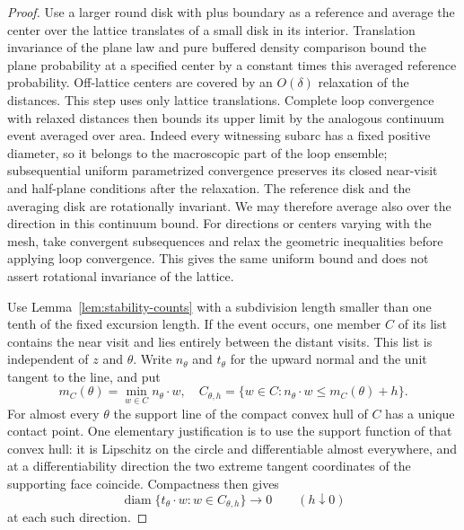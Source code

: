 \begin{proof}
Use a larger round disk with plus boundary as a reference and average
the center over the lattice translates of a small disk in its interior.
Translation invariance of the plane law and pure buffered density
comparison bound the plane probability at a specified center by
a constant times this averaged reference probability.  Off-lattice
centers are covered by an $O(\delta)$ relaxation of the distances.
This step uses only lattice translations.  Complete loop convergence
with relaxed distances then bounds its upper limit by the analogous
continuum event averaged over area.  Indeed every witnessing subarc
has a fixed positive diameter, so it belongs to the macroscopic part
of the loop ensemble; subsequential uniform parametrized convergence
preserves its closed near-visit and half-plane conditions after the
relaxation.  The reference disk and the
averaging disk are rotationally invariant.  We may therefore average
also over the direction in this continuum bound.  For directions or
centers varying with the mesh, take convergent subsequences and relax
the geometric inequalities before applying loop convergence.  This
gives the same uniform bound and does not assert rotational
invariance of the lattice.

Use Lemma~\ref{lem:stability-counts} with a subdivision length smaller
than one tenth of the fixed excursion length.  If the event occurs,
one member $C$ of its list contains the near visit and lies entirely
between the distant visits.  This list is independent of $z$ and
$\theta$.  Write $n_\theta$ and $t_\theta$ for the upward normal and
the unit tangent to the line, and put
\[
 m_C(\theta)=\min_{w\in C}n_\theta\cdot w,
 \quad
 C_{\theta,h}=\{w\in C:n_\theta\cdot w\leq m_C(\theta)+h\}.
\]
For almost every $\theta$ the support line of the compact convex hull
of $C$ has a unique contact point.  One elementary justification is
to use the support function of that convex hull: it is Lipschitz
on the circle and differentiable almost everywhere, and at a
differentiability direction the two extreme tangent coordinates of
the supporting face coincide.  Compactness then gives
\begin{equation}
 \operatorname{diam}\{t_\theta\cdot w:w\in C_{\theta,h}\}
       \longrightarrow0\qquad(h\downarrow0)
 \label{eq:stability-support-width}
\end{equation}
at each such direction.


\end{proof}
